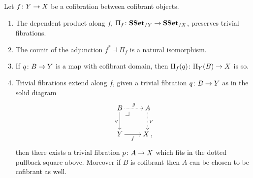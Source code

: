 \documentclass[reqno,10pt,a4paper,oneside,draft]{amsart}
\begin{document}
\begin{lemma}\label{Lemma:ForTheExtProperty} Let  $f \colon Y \rightarrow X$ be a cofibration between
cofibrant objects. 
\begin{enumerate}[$(i)$]
\item The dependent product along $f$, $\Pi_f \colon \mathbf{SSet}_{/Y} \rightarrow \mathbf{SSet}_{/X}$, preserves trivial fibrations.
\item The counit of the adjunction $f^* \dashv \Pi_f$ is a natural isomorphism.
\item If $q \colon B \to Y$ is a map with cofibrant domain, then $\Pi_f(q) \colon \Pi_Y(B) \to X$  is so.
\item Trivial fibrations extend along $f$, \ie given a trivial fibration $q
 \colon B \to Y$  as in the solid diagram
\[
\xymatrix{
B \ar@{.>}[r]^{g} \ar[d]_{q} \drpullback  & A \ar@{.>}[d]^{p} \\
Y \ar[r]_-f &  X \, ,}
\]
then there exists a trivial fibration $p \colon A \rightarrow X$ which fits in the dotted pullback square above. Moreover if $B$ is cofibrant  then 
$A$ can be chosen to be 
cofibrant as well.
\end{enumerate}
\end{lemma}
\end{document}
